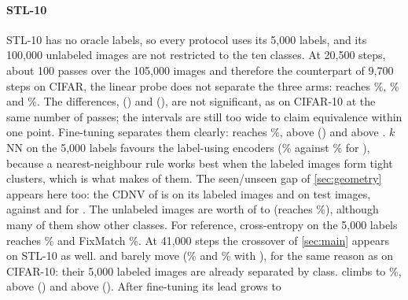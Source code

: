 \paragraph{STL-10}
STL-10 has no oracle labels, so every protocol uses its 5,000 labels, and its 100,000 unlabeled images are
not restricted to the ten classes. At 20,500 steps, about 100 passes over the 105,000 images and therefore
the counterpart of 9,700 steps on CIFAR, the linear probe does not separate the three arms: \simclr reaches
\%, \supcon {}\% and \union
{}\%. The differences, \pt
() and \pt
(), are not significant, as on CIFAR-10 at the same number of passes;
the intervals are still too wide to claim equivalence within one point. Fine-tuning
separates them clearly: \simclr reaches \%, \pt
above \supcon () and \pt above \union.
$k$NN on the 5,000 labels favours the label-using encoders (\% against
\% for \simclr), because a nearest-neighbour rule works best when the labeled
images form tight clusters, which is what \supcon makes of them. The seen/unseen gap of
\cref{sec:geometry} appears here too: the CDNV of \supcon is  on its labeled
images and  on test images, against  and
 for \simclr. The unlabeled images are worth
\pt of \lpfive to \simclr (\simclrsub reaches
\%), although many of them show other classes. For reference, cross-entropy on the
5,000 labels reaches \% and FixMatch \%.
At 41,000 steps the crossover of \cref{sec:main} appears on STL-10 as well. \supcon and \union barely move
(\% and \% with \lpfive), for the same reason as on
CIFAR-10: their 5,000 labeled images are already separated by class. \simclr climbs to
\%, \pt above \supcon
() and \pt above \union
(). After fine-tuning its lead grows to
